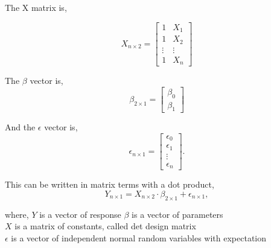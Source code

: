 \noindent The X matrix is, 

\begin{equation}X_{n \times 2}=
\left[
\begin{array}{cc}
	1 & X_1 \\ 
	1 & X_2 \\ 
	\vdots & \vdots \\
	1 & X_n
\end{array}
\right]
\end{equation}


\noindent The $\beta$ vector is, 
\begin{equation}\beta_{2 \times 1} =
\left[
\begin{array}{c}
	\beta_0 \\ 
	\beta_1 
\end{array}
\right]
\end{equation}

\noindent And the $\epsilon$ vector is,
\begin{equation} \epsilon_{n \times 1} =
\left[
\begin{array}{c}
	\epsilon_0 \\ 
	\epsilon_1 \\
	\vdots \\
	\epsilon_n 
\end{array}
\right].
\end{equation}

\noindent This can be written in matrix terms with a dot product, 
\begin{equation} Y_{n \times 1}=X_{n \times 2} \cdot \beta_{2 \times 1} + \epsilon_{n \times 1} ,
\end{equation}

\noindent where, \newline
\textbf{$Y$} is a vector of response \newline
\textbf{$\beta$} is a vector of parameters \\
\textbf{$X$} is a matrix of constants, called det design matrix\\
\textbf{$\epsilon$} is a vector of independent normal random variables with expectation\\

